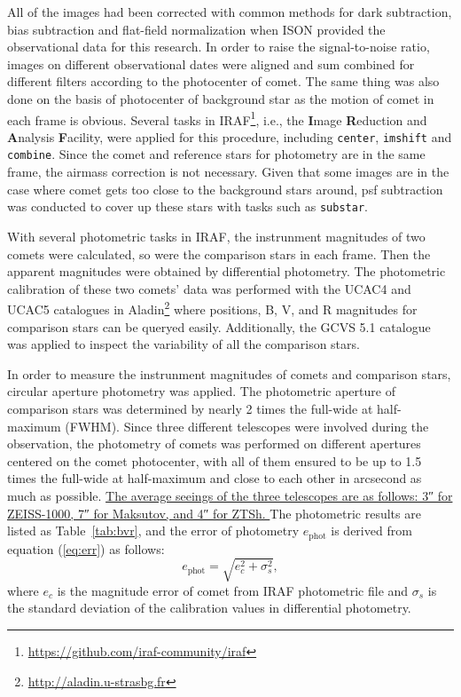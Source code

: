 All of the images had been corrected with common methods for dark subtraction, bias subtraction and flat-field normalization when ISON provided the observational data for this research. In order to raise the signal-to-noise ratio, images on different observational dates were aligned and sum combined for different filters according to the photocenter of comet. The same thing was also done on the basis of photocenter of background star as the motion of comet in each frame is obvious. Several tasks in IRAF\footnote{\href{https://github.com/iraf-community/iraf}{https://github.com/iraf-community/iraf}}, i.e., the \textbf{I}mage \textbf{R}eduction and \textbf{A}nalysis \textbf{F}acility, were applied for this procedure, including \texttt{center}, \verb|imshift| and \verb|combine|. Since the comet and reference stars for photometry are in the same frame, the airmass correction is not necessary. Given that some images are in the case where comet gets too close to the background stars around, psf subtraction was conducted to cover up these stars with tasks such as \verb|substar|. 

With several photometric tasks in IRAF, the instrunment magnitudes of two comets were calculated, so were the comparison stars in each frame. Then the apparent magnitudes were obtained by differential photometry. The photometric calibration of these two comets' data was performed with the UCAC4 \citep{zacharias_fourth_2013} and UCAC5 \citep{zacharias_ucac5_2017} catalogues in 
Aladin\footnote{\href{http://aladin.u-strasbg.fr}{http://aladin.u-strasbg.fr}} 
where positions, B, V, and R magnitudes for comparison stars can be queryed easily. Additionally, the GCVS 5.1 \citep{samus_general_2017} catalogue was applied to inspect the variability of all the comparison stars. 

In order to measure the  instrunment magnitudes of comets and comparison stars, circular aperture photometry was applied. The photometric aperture of comparison stars was determined by nearly \si{\num{2}} times the full-wide at half-maximum (FWHM). Since three different telescopes were involved during the observation, the photometry of comets was performed on different apertures centered on the comet photocenter, with all of them ensured to be up to \si{\num{1.5}} times the full-wide at half-maximum and close to each other in arcsecond as much as possible. 
\ul{ %
    The average seeings of the three telescopes are as follows: \ang{;;3} for ZEISS-1000, \ang{;;7} for Maksutov, and \ang{;;4} for ZTSh. 
} 
The photometric results are listed as Table~\ref{tab:bvr}, and the error of photometry $e_{\mathrm{phot}}$ is derived from equation (\ref{eq:err}) as follows: 
\begin{equation}
    e_{\mathrm{phot}} = \sqrt{e_{c}^{2} + \sigma_s^2}, 
    \label{eq:err}
\end{equation}
where $e_c$ is the magnitude error of comet from IRAF photometric file and $\sigma_s$ is the standard deviation of the calibration values in differential photometry. 



